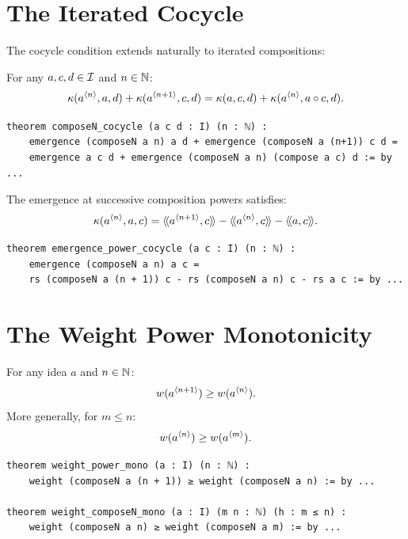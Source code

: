 \section{The Iterated Cocycle}

The cocycle condition extends naturally to iterated compositions:

\begin{theorem}
\label{thm:composeN-cocycle}
For any $a, c, d \in \mathcal{I}$ and $n \in \mathbb{N}$:
\[
  \kappa(a^{\langle n \rangle}, a, d) + \kappa(a^{\langle n+1 \rangle}, c, d)
  = \kappa(a, c, d) + \kappa(a^{\langle n \rangle}, a \circ c, d).
\]
\end{theorem}

\begin{lstlisting}[caption={ComposeN cocycle (IDT\_v3\_Emergence.lean)}]
theorem composeN_cocycle (a c d : I) (n : ℕ) :
    emergence (composeN a n) a d + emergence (composeN a (n+1)) c d =
    emergence a c d + emergence (composeN a n) (compose a c) d := by ...
\end{lstlisting}

\begin{theorem}
\label{thm:emergence-power-cocycle}
The emergence at successive composition powers satisfies:
\[
  \kappa(a^{\langle n \rangle}, a, c) = \langle\!\langle a^{\langle n+1 \rangle}, c \rangle\!\rangle - \langle\!\langle a^{\langle n \rangle}, c \rangle\!\rangle - \langle\!\langle a, c \rangle\!\rangle.
\]
\end{theorem}

\begin{lstlisting}[caption={Power cocycle (IDT\_v3\_Emergence.lean)}]
theorem emergence_power_cocycle (a c : I) (n : ℕ) :
    emergence (composeN a n) a c =
    rs (composeN a (n + 1)) c - rs (composeN a n) c - rs a c := by ...
\end{lstlisting}


\section{The Weight Power Monotonicity}

\begin{theorem}
\label{thm:weight-power-mono}
For any idea $a$ and $n \in \mathbb{N}$:
\[
  w(a^{\langle n+1 \rangle}) \geq w(a^{\langle n \rangle}).
\]
More generally, for $m \leq n$:
\[
  w(a^{\langle n \rangle}) \geq w(a^{\langle m \rangle}).
\]
\end{theorem}

\begin{lstlisting}[caption={Weight power monotonicity (IDT\_v3\_Emergence.lean)}]
theorem weight_power_mono (a : I) (n : ℕ) :
    weight (composeN a (n + 1)) ≥ weight (composeN a n) := by ...

theorem weight_composeN_mono (a : I) (m n : ℕ) (h : m ≤ n) :
    weight (composeN a n) ≥ weight (composeN a m) := by ...
\end{lstlisting}


